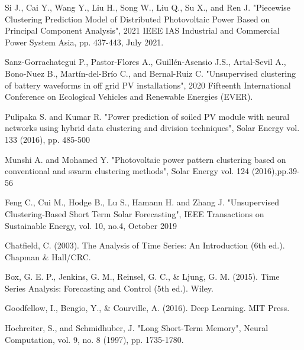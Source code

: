 \documentclass[a4paper,12pt]{article}
\begin{document}
\begin{thebibliography}{99}
Si J., Cai Y., Wang Y., Liu H., Song W., Liu Q., Su X., and Ren J. "Piecewise Clustering Prediction Model of Distributed Photovoltaic Power Based on Principal Component Analysis", 2021 IEEE IAS Industrial and Commercial Power System Asia, pp. 437-443, July 2021.

Sanz-Gorrachategui P., Pastor-Flores A., Guillén-Asensio J.S., Artal-Sevil A., Bono-Nuez
B., Martín-del-Brío C., and Bernal-Ruiz C. "Unsupervised clustering of battery waveforms in off grid PV installations", 2020 Fifteenth International Conference on Ecological Vehicles and Renewable Energies (EVER).

Pulipaka S. and Kumar R. "Power prediction of soiled PV module with neural networks using hybrid data clustering and division techniques", Solar Energy vol. 133 (2016), pp. 485-500

Munshi A. and Mohamed Y. "Photovoltaic power pattern clustering based on conventional and swarm clustering methods", Solar Energy vol. 124 (2016),pp.39-56

Feng C., Cui M., Hodge B., Lu S., Hamann H. and Zhang J. "Unsupervised Clustering-Based Short Term Solar Forecasting", IEEE Transactions on Sustainable Energy, vol. 10, no.4, October 2019

Chatfield, C. (2003). The Analysis of Time Series: An Introduction (6th ed.). Chapman \& Hall/CRC.

Box, G. E. P., Jenkins, G. M., Reinsel, G. C., \& Ljung, G. M. (2015). Time Series Analysis: Forecasting and Control (5th ed.). Wiley.

Goodfellow, I., Bengio, Y., \& Courville, A. (2016). Deep Learning. MIT Press.

Hochreiter, S., and Schmidhuber, J. "Long Short-Term Memory", Neural Computation, vol. 9, no. 8 (1997), pp. 1735-1780.

\end{thebibliography}
\end{document}
